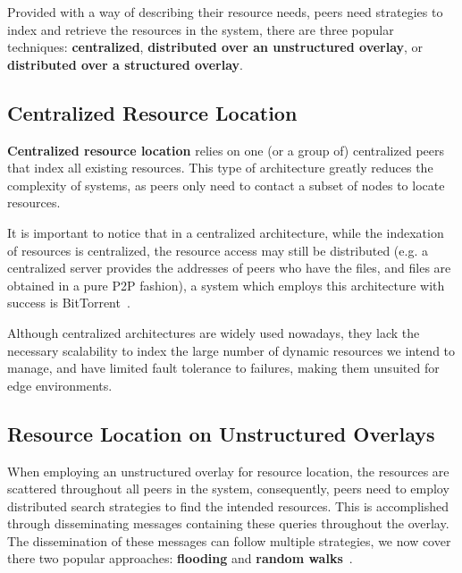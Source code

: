 Provided with a way of describing their resource needs, peers need strategies to index and retrieve the resources in the system, there are three popular techniques: \textbf{centralized}, \textbf{distributed over an unstructured overlay}, or \textbf{distributed over a structured overlay}.

\subsection{Centralized Resource Location}

\textbf{Centralized resource location} relies on one (or a group of) centralized peers that index all existing resources. This type of architecture greatly reduces the complexity of systems, as peers only need to contact a subset of nodes to locate resources. 

It is important to notice that in a centralized architecture, while the indexation of resources is centralized, the resource access may still be distributed (e.g. a centralized server provides the addresses of peers who have the files, and files are obtained in a pure P2P fashion), a system which employs this architecture with success is BitTorrent~\cite{cohen2003incentives}.

Although centralized architectures are widely used nowadays, they lack the necessary scalability to index the large number of dynamic resources we intend to manage, and have limited fault tolerance to failures, making them unsuited for edge environments. 


\subsection{Resource Location on Unstructured Overlays}

When employing an unstructured overlay for resource location, the resources are scattered throughout all peers in the system, consequently, peers need to employ distributed search strategies to find the intended resources. This is accomplished through disseminating messages containing these queries throughout the overlay. The dissemination of these messages can follow multiple strategies, we now cover there two popular approaches: \textbf{flooding} and \textbf{random walks}~\cite{leitaoPHDthesis}. 

